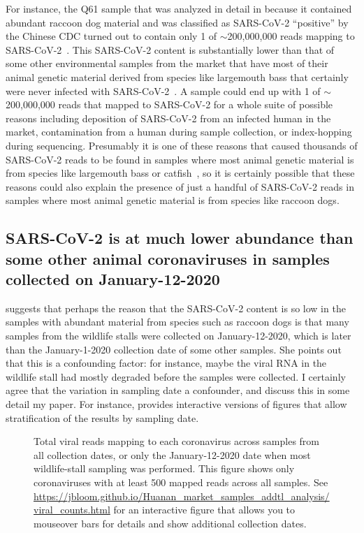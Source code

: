 \documentclass[9pt,onecolumn,twoside]{gsajnl_modified}
\begin{document}
For instance, the Q61 sample that was analyzed in detail in \citet{crits2023genetic} because it contained abundant raccoon dog material and was classified as SARS-CoV-2 ``positive'' by the Chinese CDC turned out to contain only 1 of $\sim$200,000,000 reads mapping to SARS-CoV-2~\citep{bloom2023association}.
This SARS-CoV-2 content is substantially lower than that of some other environmental samples from the market that have most of their animal genetic material derived from species like largemouth bass that certainly were never infected with SARS-CoV-2~\citep{bloom2023association}.
A sample could end up with 1 of $\sim$200,000,000 reads that mapped to SARS-CoV-2 for a whole suite of possible reasons including deposition of SARS-CoV-2 from an infected human in the market, contamination from a human during sample collection, or index-hopping during sequencing.
Presumably it is one of these reasons that caused thousands of SARS-CoV-2 reads to be found in samples where most animal genetic material is from species like largemouth bass or catfish~\citep{bloom2023association}, so it is certainly possible that these reasons could also explain the presence of just a handful of SARS-CoV-2 reads in samples where most animal genetic material is from species like raccoon dogs.

\subsection{SARS-CoV-2 is at much lower abundance than some other animal coronaviruses in samples collected on January-12-2020}
\citet{debarre2024what} suggests that perhaps the reason that the SARS-CoV-2 content is so low in the samples with abundant material from species such as raccoon dogs is that many samples from the wildlife stalls were collected on January-12-2020, which is later than the January-1-2020 collection date of some other samples.
She points out that this is a confounding factor: for instance, maybe the viral RNA in the wildlife stall had mostly degraded before the samples were collected.
I certainly agree that the variation in sampling date a confounder, and discuss this in some detail my paper.
For instance, \citet{bloom2023association} provides interactive versions of figures that allow stratification of the results by sampling date.

\begin{figure}
\caption{
Total viral reads mapping to each coronavirus across samples from all collection dates, or only the January-12-2020 date when most wildlife-stall sampling was performed.
This figure shows only coronaviruses with at least 500 mapped reads across all samples.
See \url{https://jbloom.github.io/Huanan_market_samples_addtl_analysis/viral_counts.html} for an interactive figure that allows you to mouseover bars for details and show additional collection dates.
\label{fig:viral_counts}
}
\end{figure}
\end{document}
